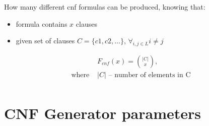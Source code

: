 How many different cnf formulas can be produced, knowing that:
\begin{itemize}
	\item formula contains $x$ clauses
	\item given set of clauses $C = \{c1, c2, \dots\}$, $\forall_{i,j \in L} i \neq j$
\end{itemize}

\begin{align*}
	&F_{cnf}(x) = \binom{|C|}{x}, \\
	\text{where }
	&|C| \text{ -- number of elements in C} \\
\end{align*}

\section{CNF Generator parameters}

